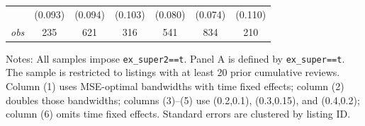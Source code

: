 \begin{table}[!htbp]
\begin{tabular}{lcccccc}
 & (0.093) & (0.094) & (0.103) & (0.080) & (0.074) & (0.110) \\
\textit{obs} & 235 & 621 & 316 & 541 & 834 & 210 \\
\bottomrule
\end{tabular}
\begin{minipage}{0.98\textwidth}\footnotesize
Notes: All samples impose \texttt{ex\_super2==t}. Panel A is defined by \texttt{ex\_super==t}. The sample is restricted to listings with at least 20 prior cumulative reviews. Column (1) uses MSE-optimal bandwidths with time fixed effects; column (2) doubles those bandwidths; columns (3)--(5) use (0.2,0.1), (0.3,0.15), and (0.4,0.2); column (6) omits time fixed effects. Standard errors are clustered by listing ID.
\end{minipage}
\end{table}
